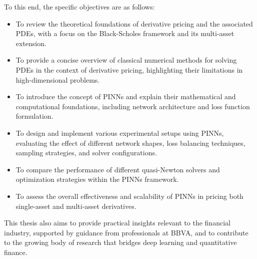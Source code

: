 \documentclass[12pt]{report} %
\theoremstyle{plain}           %
\theoremstyle{definition}      %
\theoremstyle{remark}          %
\begin{document}
To this end, the specific objectives are as follows:
\begin{itemize}
    \item To review the theoretical foundations of derivative pricing and the associated PDEs, with a focus on the Black-Scholes framework and its multi-asset extension.
    \item To provide a concise overview of classical numerical methods for solving PDEs in the context of derivative pricing, highlighting their limitations in high-dimensional problems.
    \item To introduce the concept of PINNs and explain their mathematical and computational foundations, including network architecture and loss function formulation.
    \item To design and implement various experimental setups using PINNs, evaluating the effect of different network shapes, loss balancing techniques, sampling strategies, and solver configurations.
    \item To compare the performance of different quasi-Newton solvers and optimization strategies within the PINNs framework.
    \item To assess the overall effectiveness and scalability of PINNs in pricing both single-asset and multi-asset derivatives.
\end{itemize}

This thesis also aims to provide practical insights relevant to the financial industry, supported by 
guidance from professionals at BBVA, and to contribute to the growing body of research that bridges 
deep learning and quantitative finance.
\end{document}
